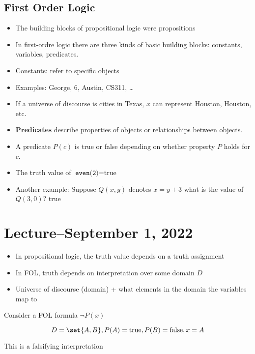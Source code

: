 \documentclass{scrreprt}
\newcommand{\true}{\text{true}}
\newcommand{\false}{\text{false}}
\begin{document}
\subsection{First Order Logic}
\begin{itemize}
	\item The building blocks of propositional logic were propositions
	\item In first-ordre logic there are three kinds of basic building blocks:
	      constants, variables, predicates.
	\item Constants: refer to specific objects
	\item Examples: George, 6, Austin, CS311, \ldots
	\item If a universe of discourse is cities in Texas, $x$ can represent Houston,
	      Houston, etc.
	\item \textbf{Predicates} describe properties of objects or relationships between objects.
	\item A predicate $P(c)$ is true or false depending on whether property
	      $P$ holds for $c$.
	\item The truth value of $\texttt{even(2)} = \true$
	\item Another example: Suppose $Q(x, y)$ denotes $x=y+3$ what is the value of
	      $Q(3, 0)$? $\true$
\end{itemize}

\section{Lecture--September 1, 2022}
\begin{itemize}
	\item In propositional logic, the truth value depends on a truth assignment
	\item In FOL, truth depends on interpretation over some domain $D$
	\item Universe of discourse (domain) + what elements in the domain the variables map to
\end{itemize}

\begin{example}
	Consider a FOL formula $\neg P(x)$

	\[D=\set{A, B}, P(A)=\true, P(B)=\false, x=A\]

	This is a falsifying interpretation
\end{example}
\end{document}
